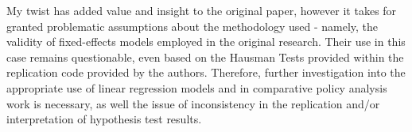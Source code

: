 \documentclass[12pt,letterpaper]{article}
\begin{document}
	\vspace{.25cm}	
	
	\noindent My twist has added value and insight to the original paper, however it takes for granted problematic assumptions about the methodology used - namely, the validity of fixed-effects models employed in the original research. Their use in this case remains questionable, even based on the Hausman Tests provided within the replication code provided by the authors. Therefore, further investigation into the appropriate use of linear regression models and in comparative policy analysis work is necessary, as well the issue of inconsistency in the replication and/or interpretation of hypothesis test results.
\end{document}

